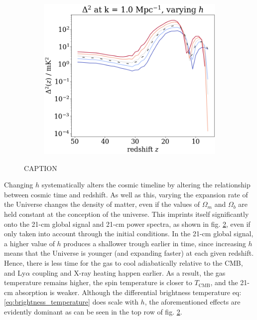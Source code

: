 \documentclass[floats,floatfix,showpacs,amssymb,prd,superscriptaddress,nofootinbib]{revtex4-2} %
\begin{document}
\begin{figure}[H]
\begin{subfigure}[b]{0.45\textwidth}
     \end{subfigure}
     \hfill
     \begin{subfigure}[b]{0.45\textwidth}
         \centering
         \includegraphics[width=\textwidth]{images/simulation_results/power_spectrum_fixed_k_1.0_h.png}
         \label{fig:power_spectrum_fixed_k_1.0_h}
     \end{subfigure}
        \caption{CAPTION}
        \label{fig:simulation_results_h}
\end{figure}

Changing $h$ systematically alters the cosmic timeline by altering the relationship between cosmic time and redshift. As well as this, varying the expansion rate of the Universe changes the density of matter, even if the values of $\Omega_m$ and $\Omega_b$ are held constant at the conception of the universe. This imprints itself significantly onto the 21-cm global signal and 21-cm power spectra, as shown in fig. \ref{fig:simulation_results_h}, even if only taken into account through the initial conditions. In the 21-cm global signal, a higher value of $h$ produces a shallower trough earlier in time, since increasing $h$ means that the Universe is younger (and expanding faster) at each given redshift. Hence, there is less time for the gas to cool adiabatically relative to the CMB, and Ly$\alpha$ coupling and X-ray heating happen earlier. As a result, the gas temperature remains higher, the spin temperature is closer to $T_{\text{CMB}}$, and the 21-cm absorption is weaker. Although the differential brightness temperature eq: \ref{eq:brightness_temperature} does scale with $h$, the aforementioned effects are evidently dominant as can be seen in the top row of fig. \ref{fig:simulation_results_h}. 
\end{document}
